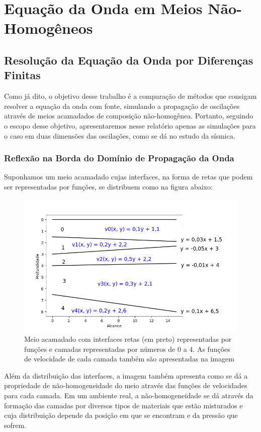 \chapter{Equação da Onda em Meios Não-Homogêneos}

    \label{cap:CompMDFeRT}

    \section{Resolução da Equação da Onda por Diferenças Finitas}
    
        Como já dito, o objetivo desse trabalho é a comparação de métodos que consigam resolver a equação da onda com fonte, 
        simulando a propagação de oscilações através de meios acamadados de composição não-homogênea. Portanto, 
        seguindo o escopo desse objetivo, apresentaremos nesse relatório apenas as simulações para o caso em duas 
        dimensões das oscilações, como se dá no estudo da sísmica.
    
        \subsection{Reflexão na Borda do Domínio de Propagação da Onda}
	        
            Suponhamos um meio acamadado cujas interfaces, na forma de retas que podem ser representadas por funções, 
            se distribuem como na figura abaixo:
            \begin{figure}[H]
                \centering
                \includegraphics[scale=.7]{imagens/ilustracoes/TR.png}
                \caption{Meio acamadado com interfaces retas (em preto) representadas por funções e camadas representadas
                por números de 0 a 4. As funções de velocidade de cada camada também são apresentadas na imagem}
                \label{fig:interfacesAndMedium}
            \end{figure}
            Além da distribuição das interfaces, a imagem também apresenta como se dá a propriedade de não-homogeneidade do 
            meio através das funções de velocidades para cada camada. Em um ambiente real, a não-homogeneidade se dá através 
            da formação das camadas por diversos tipos de materiais que estão misturados e cuja distribuição depende da posição 
            em que se encontram e da pressão que sofrem.
            
